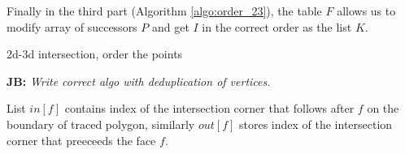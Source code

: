 \documentclass{elsarticle}
\def\abs#1{\left|#1\right|}
\def\abs#1{| #1 |}
\newcommand{\noteJB}[1]{{\color{Blue} \textbf{JB: } \textit{#1}}}
\newcommand{\notePE}[1]{{\color{Orange} \textbf{PE: } \textit{#1}}}
\begin{document}
% 
% 



Finally in the third part (Algorithm \ref{algo:order_23}), the table $F$ allows us to modify array of successors $P$ and get $I$ in the correct order as the list $K$.










\begin{algorithm}
  \caption{2d-3d intersection, order the points}  
  \label{algo:order_23}
  
  \DontPrintSemicolon
  
  \lIf{$\abs{I} < 3$}{ return $J$}
\end{algorithm}
\noteJB{Write correct algo with deduplication of vertices.}
  
 List $in[f]$ contains index of the intersection corner that follows after $f$ on the boundary of traced polygon, 
 similarly $out[f]$ stores index of the intersection corner that preeceeds the face $f$.
\end{document}
